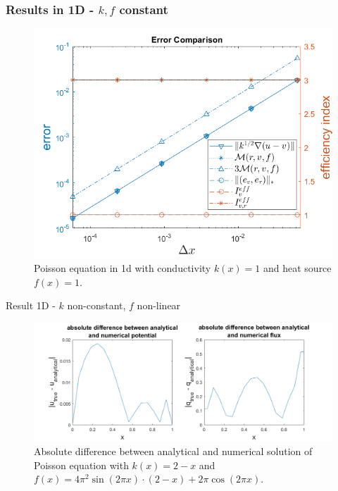 \documentclass[t]{beamer}
\begin{document}
\begin{frame}
\frametitle{Results in 1D - $k,f$ constant}
\vspace{-18pt}
\begin{figure}[t]
\includegraphics[width = 0.7\linewidth]{convergenceplot_k_f_constant.png}
\caption{Poisson equation in 1d with conductivity $k(x) = 1$ and heat source $f(x) = 1$.}
\label{fig:Convergence1d1}
\end{figure}
\end{frame}

\begin{frame}{Result 1D - $k$ non-constant, $f$ non-linear }
\begin{figure}
\vspace{10pt}
\centering
\includegraphics[width = 1.05\linewidth, left]{difference_analytical_numerical.png}
\caption{Absolute difference between analytical and numerical solution of Poisson equation with $k(x) = 2-x$ and $f(x) = 4\pi^2\sin(2\pi x)\cdot (2-x) + 2\pi\cos(2\pi x)$.}
\label{fig:fig:diff}
\end{figure}
\end{frame}
\end{document}
